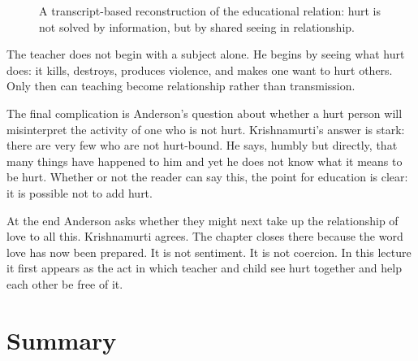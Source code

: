 \begin{figure}
\centering
{}
\caption{A transcript-based reconstruction of the educational relation: hurt is not solved by information, but by shared seeing in relationship.}
\end{figure}

The teacher does not begin with a subject alone. He begins by seeing what hurt does: it kills, destroys, produces violence, and makes one want to hurt others. Only then can teaching become relationship rather than transmission.

The final complication is Anderson's question about whether a hurt person will misinterpret the activity of one who is not hurt. Krishnamurti's answer is stark: there are very few who are not hurt-bound. He says, humbly but directly, that many things have happened to him and yet he does not know what it means to be hurt. Whether or not the reader can say this, the point for education is clear: it is possible not to add hurt.

At the end Anderson asks whether they might next take up the relationship of love to all this. Krishnamurti agrees. The chapter closes there because the word love has now been prepared. It is not sentiment. It is not coercion. In this lecture it first appears as the act in which teacher and child see hurt together and help each other be free of it.

\section{Summary}


